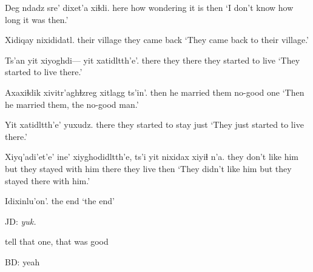 \documentclass[12pt]{article}
\begin{document}
\gll Deg ndadz sre'      dixet'a xiɬdi.
here how       wondering {it is}   then
\glt `I don't know how long it was then.'
\glend

\gll Xidiqay       nixididatl.
{their village} {they came back}
\glt `They came back to their village.'
\glend

\gll Ts'an yit  xiyoghdi--- yit   xatidltth'e'.
there they {}    there {they started to live}
\glt `They started to live there.'
\glend

\gll Axaxiɬdik xivitr'aghɬzreg xitlagg ts'in'.
then      {he married them}   {no-good one} 
\glt `Then he married them, the no-good man.'
\glend

\gll Yit   xatidltth'e'         yuxudz.
there {they started to stay} just
\glt `They just started to live there.'
\glend

\gll Xiyq'adi'et'e'      ine' xiyghodidltth'e,      ts'i yit   nixidax   xiyiɬ n'a.
{they don't like him} but     {they stayed with him} {}     there {they live} then
\glt `They didn't like him but they stayed there with him.'
\glend

\gll Idixinlu'on'. 
{{the end}}
\glt `the end'
\glend 

JD:  \em yuk. \em 

tell that one, that was good

BD:  yeah
\end{document}
